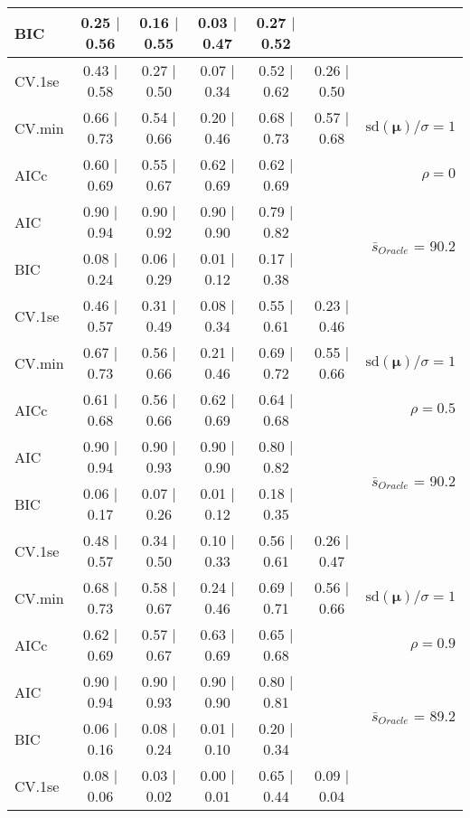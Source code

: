 \begin{table}
\begin{center}
\begin{tabular}{l*{5}{c}|r}
BIC & 0.25 $\mid$ 0.56 & 0.16 $\mid$ 0.55 & 0.03 $\mid$ 0.47 & 0.27 $\mid$ 0.52 & &  \\
 \hline 
CV.1se & 0.43 $\mid$ 0.58 & 0.27 $\mid$ 0.50 & 0.07 $\mid$ 0.34 & 0.52 $\mid$ 0.62 & 0.26 $\mid$ 0.50 & \\
CV.min & 0.66 $\mid$ 0.73 & 0.54 $\mid$ 0.66 & 0.20 $\mid$ 0.46 & 0.68 $\mid$ 0.73 & 0.57 $\mid$ 0.68 &  $\mathrm{sd}(\mathbf{\mu})/\sigma=1$ \\
AICc & 0.60 $\mid$ 0.69 & 0.55 $\mid$ 0.67 & 0.62 $\mid$ 0.69 & 0.62 $\mid$ 0.69 & & $\rho=0$ \\
AIC & 0.90 $\mid$ 0.94 & 0.90 $\mid$ 0.92 & 0.90 $\mid$ 0.90 & 0.79 $\mid$ 0.82 & &  \multirow{2}{*}{$\bar{s}_{Oracle}$ = 90.2} \\
BIC & 0.08 $\mid$ 0.24 & 0.06 $\mid$ 0.29 & 0.01 $\mid$ 0.12 & 0.17 $\mid$ 0.38 & &  \\
 \hline 
CV.1se & 0.46 $\mid$ 0.57 & 0.31 $\mid$ 0.49 & 0.08 $\mid$ 0.34 & 0.55 $\mid$ 0.61 & 0.23 $\mid$ 0.46 & \\
CV.min & 0.67 $\mid$ 0.73 & 0.56 $\mid$ 0.66 & 0.21 $\mid$ 0.46 & 0.69 $\mid$ 0.72 & 0.55 $\mid$ 0.66 &  $\mathrm{sd}(\mathbf{\mu})/\sigma=1$ \\
AICc & 0.61 $\mid$ 0.68 & 0.56 $\mid$ 0.66 & 0.62 $\mid$ 0.69 & 0.64 $\mid$ 0.68 & & $\rho=0.5$ \\
AIC & 0.90 $\mid$ 0.94 & 0.90 $\mid$ 0.93 & 0.90 $\mid$ 0.90 & 0.80 $\mid$ 0.82 & &  \multirow{2}{*}{$\bar{s}_{Oracle}$ = 90.2} \\
BIC & 0.06 $\mid$ 0.17 & 0.07 $\mid$ 0.26 & 0.01 $\mid$ 0.12 & 0.18 $\mid$ 0.35 & &  \\
 \hline 
CV.1se & 0.48 $\mid$ 0.57 & 0.34 $\mid$ 0.50 & 0.10 $\mid$ 0.33 & 0.56 $\mid$ 0.61 & 0.26 $\mid$ 0.47 & \\
CV.min & 0.68 $\mid$ 0.73 & 0.58 $\mid$ 0.67 & 0.24 $\mid$ 0.46 & 0.69 $\mid$ 0.71 & 0.56 $\mid$ 0.66 &  $\mathrm{sd}(\mathbf{\mu})/\sigma=1$ \\
AICc & 0.62 $\mid$ 0.69 & 0.57 $\mid$ 0.67 & 0.63 $\mid$ 0.69 & 0.65 $\mid$ 0.68 & & $\rho=0.9$ \\
AIC & 0.90 $\mid$ 0.94 & 0.90 $\mid$ 0.93 & 0.90 $\mid$ 0.90 & 0.80 $\mid$ 0.81 & &  \multirow{2}{*}{$\bar{s}_{Oracle}$ = 89.2} \\
BIC & 0.06 $\mid$ 0.16 & 0.08 $\mid$ 0.24 & 0.01 $\mid$ 0.10 & 0.20 $\mid$ 0.34 & &  \\
 \hline 
CV.1se & 0.08 $\mid$ 0.06 & 0.03 $\mid$ 0.02 & 0.00 $\mid$ 0.01 & 0.65 $\mid$ 0.44 & 0.09 $\mid$ 0.04 & \\

\end{tabular}
\end{center}
\end{table}
